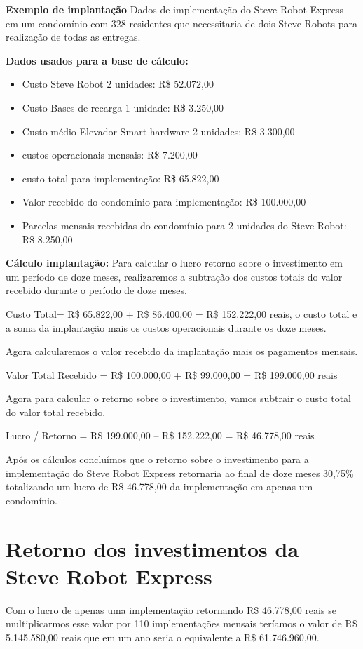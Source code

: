 \textbf{Exemplo de implantação}
Dados de implementação do Steve Robot Express em um condomínio com 328 residentes que necessitaria de dois Steve Robots para realização de todas as entregas.

\textbf{Dados usados para a base de cálculo:}
\begin{itemize}
    \item Custo Steve Robot 2 unidades: R\$ 52.072,00
    \item Custo Bases de recarga 1 unidade: R\$ 3.250,00
    \item Custo médio Elevador Smart hardware 2 unidades: R\$ 3.300,00
    \item custos operacionais mensais: R\$ 7.200,00
    \item custo total para implementação: R\$ 65.822,00
    \item Valor recebido do condomínio para implementação: R\$ 100.000,00
    \item Parcelas mensais recebidas do condomínio para 2 unidades do Steve Robot: R\$ 8.250,00
\end{itemize}

\textbf{Cálculo implantação:}
Para calcular o lucro retorno sobre o investimento em um período de doze meses, realizaremos a subtração dos custos totais do valor recebido durante o período de doze meses.

Custo Total= R\$ 65.822,00 + R\$ 86.400,00 = R\$ 152.222,00 reais, o custo total e a soma da implantação mais os custos operacionais durante os doze meses.

Agora calcularemos o valor recebido da implantação mais os pagamentos mensais.

Valor Total Recebido = R\$ 100.000,00 + R\$ 99.000,00 = R\$ 199.000,00 reais

Agora para calcular o retorno sobre o investimento, vamos subtrair o custo total do valor total recebido.

Lucro / Retorno = R\$ 199.000,00 – R\$ 152.222,00 = R\$ 46.778,00 reais

Após os cálculos concluímos que o retorno sobre o investimento para a implementação do Steve Robot Express retornaria ao final de doze meses 30,75\% totalizando um lucro de R\$ 46.778,00 da implementação em apenas um condomínio. 

\section{Retorno dos investimentos da Steve Robot Express}
Com o lucro de apenas uma implementação retornando R\$ 46.778,00 reais se multiplicarmos esse valor por 110 implementações mensais teríamos o valor de R\$ 5.145.580,00 reais que em um ano seria o equivalente a R\$ 61.746.960,00.

